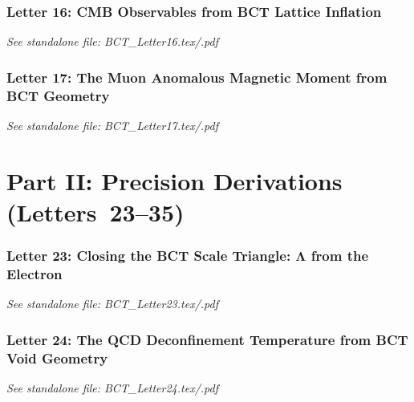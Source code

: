 \documentclass[aps,preprint,superscriptaddress,floatfix]{revtex4-2}
\begin{document}
\newpage
\section*{Letter 16: CMB Observables from BCT Lattice Inflation}
\textit{See standalone file: BCT\_Letter16.tex/.pdf}

\newpage
\section*{Letter 17: The Muon Anomalous Magnetic Moment from BCT Geometry}
\textit{See standalone file: BCT\_Letter17.tex/.pdf}

\newpage
\part*{Part II: Precision Derivations (Letters~23--35)}

\newpage
\section*{Letter 23: Closing the BCT Scale Triangle: Λ from the Electron}
\textit{See standalone file: BCT\_Letter23.tex/.pdf}

\newpage
\section*{Letter 24: The QCD Deconfinement Temperature from BCT Void Geometry}
\textit{See standalone file: BCT\_Letter24.tex/.pdf}

\newpage
\end{document}
